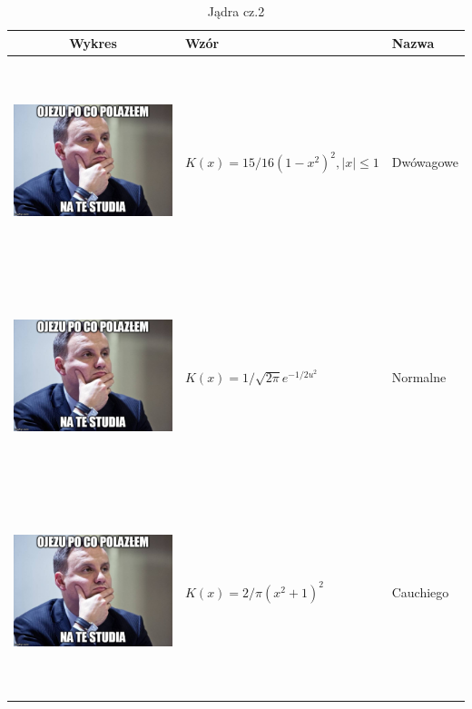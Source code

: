 \documentclass[a4paper,12pt,twoside]{article}
\begin{document}
\begin{table}[h!]
  \centering
  \caption{Jądra cz.2}
  \begin{tabular}{ | c | m{6cm} | m{3cm} | }
    \hline
    Wykres & Wzór & Nazwa \\ \hline
    \begin{minipage}[c][7cm]{.4\textwidth}
      \includegraphics[width=\linewidth, height=60mm]{dudel.jpg}
    \end{minipage}
    &
    $ K(x)=15/16(1-x^2)^2, |x|\leq1$
    & 
    Dwówagowe
    \\ \hline
    \begin{minipage}[c][7cm]{.4\textwidth}
      \includegraphics[width=\linewidth, height=60mm]{dudel.jpg}
    \end{minipage}
    &
     $ K(x)=1/\sqrt{2\pi}e^{-1/2u^2} $
    & 
    Normalne
    \\ \hline
    \begin{minipage}[c][7cm]{.4\textwidth}
      \includegraphics[width=\linewidth, height=60mm]{dudel.jpg}
    \end{minipage}
    &
     $ K(x)=2/\pi(x^2+1)^2 $
    & 
    Cauchiego
    \\ \hline
    \end{tabular}
  \label{tbl:myLboro}
\end{table}
\clearpage
\end{document}
